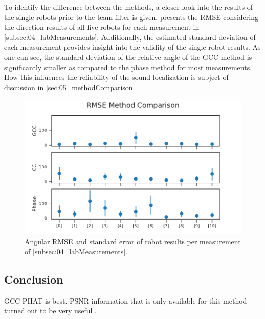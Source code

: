 To identify the difference between the methods, a closer look
into the results of the single robots prior to the team filter is given.
 presents the \ac{RMSE} considering the
direction results of all five robots for each measurement in
\cref{subsec:04_labMeasurements}.
Additionally, the estimated standard deviation of each measurement
provides insight into the validity of the single robot results.
As one can see, the standard deviation of the relative angle of the \ac{GCC}
method is significantly smaller as compared to the phase method for most
measurements.
How this influences the reliability of the sound localization is
subject of discussion in \cref{sec:05_methodComparison}.
\begin{figure}[ht]
	\centering
		\includegraphics[]{figures/evaluation/compare_rmse}
	\caption{Angular RMSE and standard error of robot results per
	measurement of \cref{subsec:04_labMeasurements}.}
    \label{fig:04_compareRmse}
\end{figure}

\subsection{Conclusion}
\label{subsec:04_tdoaConclusion}

\ac{GCC-PHAT} is best. \ac{PSNR} information that is only available for this method turned out
to be very useful .